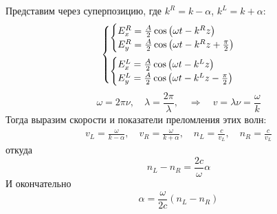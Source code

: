 \documentclass[a5paper,14pt]{article}
\begin{document}
	Представим через суперпозицию, где $k^R=k-\alpha$, $k^L=k+\alpha$:
	\begin{gather*}
		\begin{cases}
		\begin{cases} 
			E_x^R = \frac{A}{2}
				\cos\left(
					\omega t - k^Rz
					\right)
			\\
			E_y^R = \frac{A}{2}
				\cos\left(
					\omega t - k^Rz +\frac{\pi}{2}
					\right)
		\end{cases}\vspace{0.5em}\\
		\begin{cases} 
			E_x^L = \frac{A}{2}
				\cos\left(
					\omega t - k^Lz
					\right)
			\\
			E_y^L = \frac{A}{2}
				\cos\left(
					\omega t - k^Lz -\frac{\pi}{2}
					\right)
		\end{cases}			
		\end{cases}
	\end{gather*}
	\begin{equation}
		\omega=2\pi\nu,\quad
		\lambda=\frac{2\pi}{\lambda},\quad\Rightarrow\quad
		v=\lambda\nu=\frac{\omega}{k}
	\end{equation}
	Тогда выразим скорости и показатели преломления этих волн:
\begin{gather*}
	v_L=\frac{\omega}{k-\alpha},
	\quad
	v_R=\frac{\omega}{k+\alpha},
	\quad
	n_L=\frac{c}{v_L},
	\quad
	n_R=\frac{c}{v_L}
\end{gather*}
откуда 
\begin{equation*}
	n_L-n_R=\frac{2c}{\omega}\alpha
\end{equation*}
И окончательно
\begin{equation*}
	\alpha=\frac{\omega}{2c}(n_L-n_R)
\end{equation*}
\end{document}

